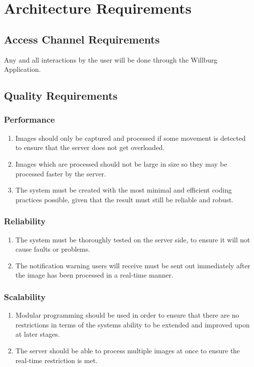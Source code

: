 \documentclass[a4paper,12pt]{report}
\begin{document}
\section{Architecture Requirements}
\subsection{Access Channel Requirements}
Any and all interactions by the user will be done through the Willburg Application.
\subsection{Quality Requirements}
\subsubsection{Performance}
\begin{enumerate}
	\item Images should only be captured and processed if some movement is detected to ensure that the server does not get overloaded.
	\item Images which are processed should not be large in size so they may be processed faster by the server.
	\item The system must be created with the most minimal and efficient coding
	practices possible, given that the result must still be reliable and robust.
\end{enumerate}
\subsubsection{Reliability}
\begin{enumerate}
	\item The system must be thoroughly tested on the server side, to
	ensure it will not cause faults or problems. 
	\item The notification warning users will receive must be sent out immediately after the image has been processed in a real-time manner.
\end{enumerate}
\subsubsection{Scalability}
\begin{enumerate}
	\item Modular programming should be used in order to ensure that there are no restrictions in terms of the systems ability to be extended and improved upon at later stages.
	\item The server should be able to process multiple images at once to ensure the real-time restriction is met.
\end{enumerate}
\end{document}
